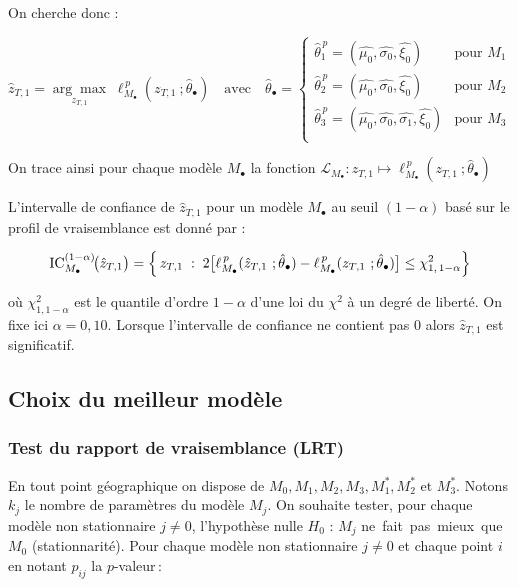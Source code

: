 \documentclass[
  article,
  nofooter,
  noheadings]{jss}
\begin{document}
On cherche donc :

\[
\hat{z}_{T,1} = \underset{z_{T,1}}{\arg\max} \; \ell_{M_\bullet}^{\,p}(z_{T,1} \ ; \hat{\theta}_{\bullet}) \quad \text{avec} \quad
\hat{\theta}_{\bullet} = \begin{cases}
\hat{\theta}_{1}^{\,p} = (\hat{\mu_0}, \hat{\sigma_0}, \hat{\xi_0}) & \text{pour } M_1 \\
\hat{\theta}_2^{\,p} = (\hat{\mu_0}, \hat{\sigma_0}, \hat{\xi_0}) & \text{pour } M_2 \\
\hat{\theta}_3^{\,p} = (\hat{\mu_0}, \hat{\sigma_0}, \hat{\sigma_1}, \hat{\xi_0}) & \text{pour } M_3 \\
\end{cases}
\]

On trace ainsi pour chaque modèle \(M_\bullet\) la fonction
\({\displaystyle \mathcal{L}_{M_\bullet} : z_{T,1} {\mapsto} \ell_{M_\bullet}^{\,p}(z_{T,1} \ ; \hat{\theta}_{\bullet})}\)

L'intervalle de confiance de \(\hat{z}_{T,1}\) pour un modèle
\(M_\bullet\) au seuil \((1 - \alpha)\) basé sur le profil de
vraisemblance est donné par :

\[
\operatorname{IC}_{M_\bullet}^{(1-\alpha)}\!\bigl(\hat{z}_{T,1}\bigr)
   = \Bigl\{\, z_{T,1}\;:\;
        2\bigl[\ell_{M_\bullet}^{\,p}(\hat{z}_{T,1} \ ; \hat{\theta}_{\bullet})-\ell_{M_\bullet}^{\,p}(z_{T,1} \ ; \hat{\theta}_{\bullet})\bigr]
        \le \chi^{2}_{1,\,1-\alpha} \Bigr\}
\]

où \(\chi^2_{1,1-\alpha}\) est le quantile d'ordre \(1 - \alpha\) d'une
loi du \(\chi^2\) à un degré de liberté. On fixe ici \(\alpha=0{,}10\).
Lorsque l'intervalle de confiance ne contient pas 0 alors
\(\hat{z}_{T,1}\) est significatif.

\subsection{Choix du meilleur modèle}\label{choix-du-meilleur-moduxe8le}

\subsubsection{Test du rapport de vraisemblance
(LRT)}\label{test-du-rapport-de-vraisemblance-lrt}

En tout point géographique on dispose de
\(M_0, M_1, M_2, M_3, M_1^\ast, M_2^\ast \text{ et } M_3^\ast\). Notons
\(k_j\) le nombre de paramètres du modèle \(M_j\). On souhaite tester,
pour chaque modèle non stationnaire \(j \neq 0\), l'hypothèse nulle
\(H_0\) : \(M_j\) ne~fait~pas~mieux~que \(M_0\) (stationnarité). Pour
chaque modèle non stationnaire \(j\neq 0\) et chaque point \(i\) en
notant \(p_{ij}\) la \(p\)-valeur\,:
\end{document}
